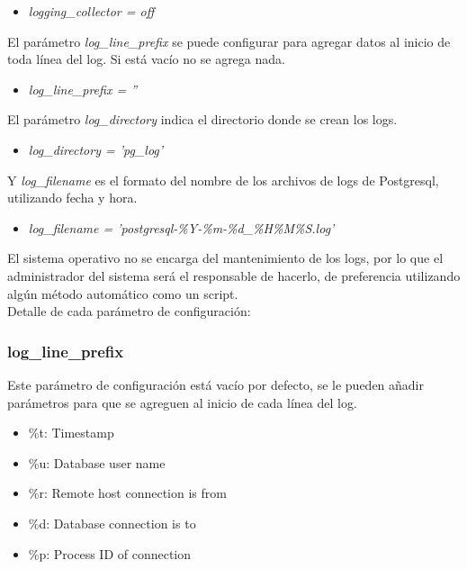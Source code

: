 \begin{itemize}
\item \emph{logging\_collector = off}
\end{itemize}

El parámetro \emph{log\_line\_prefix} se puede configurar para agregar datos al inicio de toda línea del log. Si está vacío no se agrega nada.

\begin{itemize}
\item \emph{log\_line\_prefix = ''}
\end{itemize}

El parámetro \emph{log\_directory} indica el directorio donde se crean los logs.

\begin{itemize}
\item \emph{log\_directory = 'pg\_log'}
\end{itemize}

Y \emph{log\_filename} es el formato del nombre de los archivos de logs de Postgresql, utilizando fecha y hora.

\begin{itemize}
\item \emph{log\_filename = 'postgresql-\%Y-\%m-\%d\_\%H\%M\%S.log'}
\end{itemize}

El sistema operativo no se encarga del mantenimiento de los logs, por lo que el administrador del sistema será el responsable de hacerlo, de preferencia utilizando algún método automático como un script.\\

Detalle de cada parámetro de configuración:

\subsubsection{log\_line\_prefix}

Este parámetro de configuración está vacío por defecto, se le pueden añadir parámetros para que se agreguen al inicio de cada línea del log.

\begin{itemize}
\item \%t: Timestamp
\item \%u: Database user name
\item \%r: Remote host connection is from
\item \%d: Database connection is to
\item \%p: Process ID of connection
\end{itemize}

